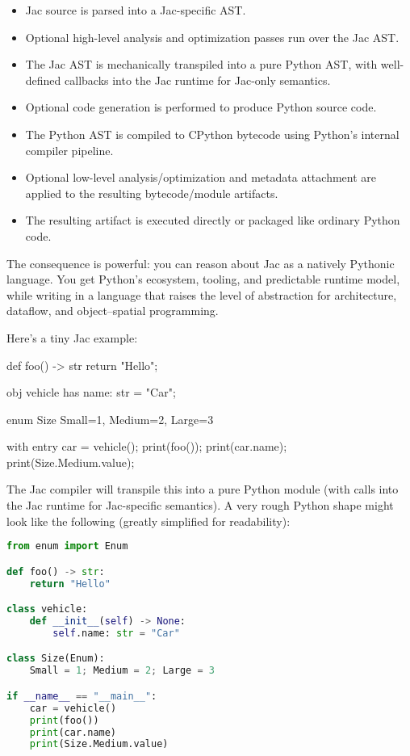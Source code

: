 \begin{itemize}
    \item Jac source is parsed into a Jac-specific AST.
    \item Optional high-level analysis and optimization passes run over the Jac AST.
    \item The Jac AST is mechanically transpiled into a pure Python AST, with well-defined callbacks into the Jac runtime for Jac-only semantics.
    \item Optional code generation is performed to produce Python source code.
    \item The Python AST is compiled to CPython bytecode using Python's internal compiler pipeline.
    \item Optional low-level analysis/optimization and metadata attachment are applied to the resulting bytecode/module artifacts.
    \item The resulting artifact is executed directly or packaged like ordinary Python code.
\end{itemize}



The consequence is powerful: you can reason about Jac as a natively Pythonic language. You get Python's ecosystem, tooling, and predictable runtime model, while writing in a language that raises the level of abstraction for architecture, dataflow, and object–spatial programming.

Here's a tiny Jac example:

\begin{jacblock}
def foo() -> str {
    return "Hello";
}

obj vehicle {
    has name: str = "Car";
}

enum Size {
    Small=1, Medium=2, Large=3
}

with entry {
    car = vehicle();
    print(foo());
    print(car.name);
    print(Size.Medium.value);
}
\end{jacblock}

The Jac compiler will transpile this into a pure Python module (with calls into the Jac runtime for Jac-specific semantics). A very rough Python shape might look like the following (greatly simplified for readability):

\begin{lstlisting}[language=Python]
from enum import Enum

def foo() -> str:
    return "Hello"

class vehicle:
    def __init__(self) -> None:
        self.name: str = "Car"

class Size(Enum):
    Small = 1; Medium = 2; Large = 3

if __name__ == "__main__":
    car = vehicle()
    print(foo())
    print(car.name)
    print(Size.Medium.value)
\end{lstlisting}

